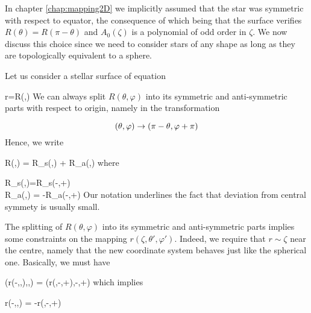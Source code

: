 In chapter \ref{chap:mapping2D} we implicitly assumed that the star was
symmetric with respect to equator, the consequence of which  being that
the surface verifies $R(\theta)=R(\pi-\theta)$ and $A_0(\zeta)$ is a
polynomial of odd order in $\zeta$. We now discuss this choice since we
need to consider stars of any shape as long as they are topologically
equivalent to a sphere.

Let us consider a stellar surface of equation

\beq r=R(\theta,\varphi)\eeq
We can always split $R(\theta,\varphi)$ into its symmetric and
anti-symmetric parts with respect to origin, namely in the
transformation

\[ (\theta,\varphi) \rightarrow (\pi-\theta,\varphi+\pi)\]
Hence, we write

\beq R(\theta,\varphi) = R_s(\theta,\varphi) + \delta R_a(\theta,\varphi)
\eeq
where

\greq
R_s(\theta,\varphi)=R_s(\pi-\theta,\varphi+\pi) \\
\delta R_a(\theta,\varphi) = -\delta R_a(\pi-\theta,\varphi+\pi)
\egreq
Our notation underlines the fact that deviation from central symmety is
usually small.

The splitting of $R(\theta,\varphi)$ into its symmetric and
anti-symmetric parts implies some constraints on the mapping
$r(\zeta,\theta',\varphi')$. Indeed, we require that $r\sim\zeta$ near
the centre, namely that the new coordinate system behaves just like the
spherical one. Basically, we must have

\beq \vr(r(-\zeta,\theta,\varphi),\theta,\varphi) =
\vr(r(\zeta,\pi-\theta,\varphi+\pi),\pi-\theta,\varphi+\pi) \eeq
which implies

\beq r(-\zeta,\theta,\varphi) = -r(\zeta,\pi-\theta,\varphi+\pi) \eeq

